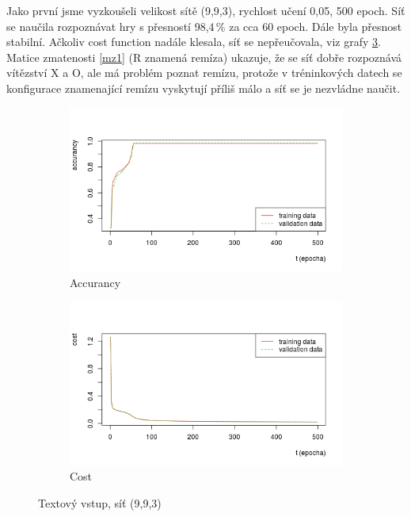 \documentclass[10pt,a4paper]{article}
\begin{document}
Jako první jsme vyzkoušeli velikost sítě (9,9,3), rychlost učení 0,05, 500 epoch. Síť se naučila rozpoznávat hry s přesností 98,4\,\% za cca 60 epoch. Dále byla přesnost stabilní. Ačkoliv cost function nadále klesala, síť se nepřeučovala, viz grafy \ref{fig:1}. Matice zmatenosti \ref{mz1} (R znamená remíza) ukazuje, že se síť dobře rozpoznává vítězství X a O, ale má problém poznat remízu, protože v tréninkových datech se konfigurace znamenající remízu vyskytují příliš málo a síť se je nezvládne naučit. 

\begin{figure}[h!]
\centering
\begin{subfigure}{.5\textwidth}
  \centering
  \includegraphics[width=\textwidth]{a1}
  \caption{Accurancy}
  \label{fig:a1}
\end{subfigure}%
\begin{subfigure}{.5\textwidth}
  \centering
  \includegraphics[width=\textwidth]{c1}
  \caption{Cost}
  \label{fig:c1}
\end{subfigure}
\caption{Textový vstup, síť (9,9,3)}
\label{fig:1}
\end{figure}
\end{document}
